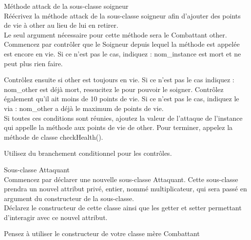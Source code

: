\begin{Exercice}[10 minutes] Méthode attack de la sous-classe soigneur \\

Réécrivez la méthode attack de la sous-classe soigneur afin d'ajouter des points de vie à other au lieu de lui en retirer. \\

Le seul argument nécessaire pour cette méthode sera le Combattant other. \\

Commencez par contrôler que le Soigneur depuis lequel la méthode est appelée est encore en vie. Si ce n'est pas le cas, indiquez : nom\_instance est mort et ne peut plus rien faire.

Contrôlez ensuite si other est toujours en vie. Si ce n'est pas le cas indiquez : nom\_other est déjà mort, ressucitez le pour pouvoir le soigner. Contrôlez également qu'il ait moins de 10 points de vie. Si ce n'est pas le cas, indiquez le via : nom\_other a déjà le maximum de points de vie. \\

Si toutes ces conditions sont réunies, ajoutez la valeur de l'attaque de l'instance qui appelle la méthode aux points de vie de other. Pour terminer, appelez la méthode de classe checkHealth().

\begin{conseil}
Utilisez du branchement conditionnel pour les contrôles. \\
\end{conseil}

\begin{solution}
	
\end{solution}

\end{Exercice}

\begin{Exercice}[5 minutes] Sous-classe Attaquant \\

Commencez par déclarer une nouvelle sous-classe Attaquant. Cette sous-classe prendra un nouvel attribut privé, entier, nommé multiplicateur, qui sera passé en argument du constructeur de la sous-classe. \\

Déclarez le constructeur de cette classe ainsi que les getter et setter permettant d'interagir avec ce nouvel attribut. \\

\begin{conseil}
Pensez à utiliser le constructeur de votre classe mère Combattant
\end{conseil}

\begin{solution}
	
\end{solution}

\end{Exercice}

